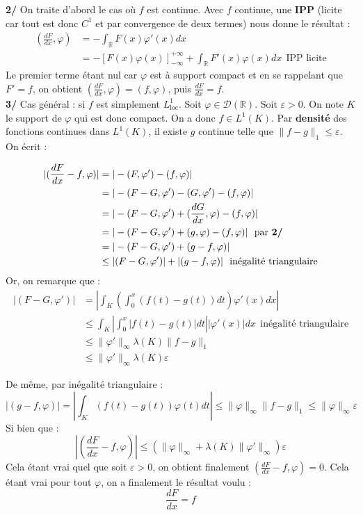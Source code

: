 \documentclass[a4paper,12pt]{article}
\begin{document}
\textbf{2/} On traite d'abord le cas où $f$ est continue. Avec $f$ continue, une \textbf{IPP} (licite car tout est donc $C^1$ et par convergence de deux termes) nous donne le résultat :
\begin{align*}
     (\frac{dF}{dx}, \varphi)  & = - \int_{\mathbb{R}} F(x) \varphi'(x) dx \\
	& = -[F(x) \varphi(x)]_{- \infty}^{+ \infty} + \int_{\mathbb{R}} F'(x) \varphi(x) dx \ \ \text{IPP licite}
\end{align*}
Le premier terme étant nul car $\varphi$ est à support compact et en se rappelant que $F'=f$, on obtient $(\frac{dF}{dx}, \varphi) = (f, \varphi)$, puis $\frac{dF}{dx} = f$. \\

\textbf{3/} Cas général : si $f$ est simplement $L^1_{\text{loc}}$.  Soit $\varphi \in \mathcal{D}(\mathbb{R})$. Soit $\varepsilon > 0$. On note $K$ le support de $\varphi$ qui est donc compact. On a donc $f \in L^1(K)$. Par \textbf{densité} des fonctions continues dans $L^1(K)$, il existe $g$ continue telle que $\|f-g\|_1 \leq \varepsilon$. On écrit :

\begin{align*}
     |(\frac{dF}{dx}-f, \varphi)|  & = |-(F, \varphi ')-(f, \varphi)| \\
     & = |-(F-G, \varphi ')-(G, \varphi ')-(f, \varphi)| \\
     & = |-(F-G, \varphi ')+(\frac{dG}{dx}, \varphi )-(f, \varphi)| \\
     & = |-(F-G, \varphi ')+(g, \varphi )-(f, \varphi)| \ \ \text{par \textbf{2/}} \\
     & = |-(F-G, \varphi ')+(g-f, \varphi)| \\
     & \leq |(F-G, \varphi ')| + |(g-f, \varphi)| \ \ \text{inégalité triangulaire}
\end{align*}
Or, on remarque que :
\begin{align*}
     |(F-G, \varphi ')| & = \left| \int_K \left( \int_0^x (f(t)-g(t))dt \right) \varphi '(x) dx \right| \\
     & \leq \int_K \left| \int_0^x |f(t)-g(t)|dt \right| |\varphi '(x)| dx \ \ \text{inégalité triangulaire} \\
     & \leq \| \varphi ' \|_{\infty} \lambda(K) \| f-g \|_1 \\
     & \boxed{\leq \|\varphi ' \|_{\infty} \lambda(K) \varepsilon}
\end{align*}

De même, par inégalité triangulaire :
$$\boxed{|(g-f, \varphi)| = \left|\int_K (f(t)-g(t)) \varphi(t) dt \right| \leq \|\varphi\|_{\infty} \|f-g\|_1 \leq \|\varphi\|_{\infty} \varepsilon}$$
Si bien que :
$$\boxed{\left| \left(\frac{dF}{dx}-f, \varphi \right) \right| \leq (\|\varphi\|_{\infty} + \lambda(K) \|\varphi '\|_{\infty}) \varepsilon}$$
Cela étant vrai quel que soit $\varepsilon > 0$, on obtient finalement $(\frac{dF}{dx}-f, \varphi)=0$. Cela étant vrai pour tout $\varphi$, on a finalement le résultat voulu :
$$\boxed{\frac{dF}{dx} = f}$$ 
\end{document}
